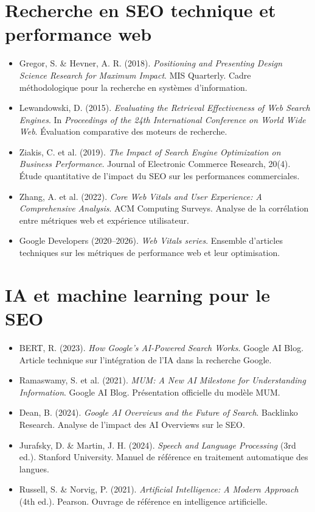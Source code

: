 \documentclass[12pt,a4paper,twoside]{report}
\begin{document}
\section*{Recherche en SEO technique et performance web}
\begin{itemize}
    \item Gregor, S. \& Hevner, A. R. (2018). \textit{Positioning and Presenting Design Science Research for Maximum Impact}. MIS Quarterly. Cadre méthodologique pour la recherche en systèmes d'information.
    \item Lewandowski, D. (2015). \textit{Evaluating the Retrieval Effectiveness of Web Search Engines}. In \textit{Proceedings of the 24th International Conference on World Wide Web}. Évaluation comparative des moteurs de recherche.
    \item Ziakis, C. et al. (2019). \textit{The Impact of Search Engine Optimization on Business Performance}. Journal of Electronic Commerce Research, 20(4). Étude quantitative de l'impact du SEO sur les performances commerciales.
    \item Zhang, A. et al. (2022). \textit{Core Web Vitals and User Experience: A Comprehensive Analysis}. ACM Computing Surveys. Analyse de la corrélation entre métriques web et expérience utilisateur.
    \item Google Developers (2020--2026). \textit{Web Vitals series}. Ensemble d'articles techniques sur les métriques de performance web et leur optimisation.
\end{itemize}

\section*{IA et machine learning pour le SEO}
\begin{itemize}
    \item BERT, R. (2023). \textit{How Google's AI-Powered Search Works}. Google AI Blog. Article technique sur l'intégration de l'IA dans la recherche Google.
    \item Ramaswamy, S. et al. (2021). \textit{MUM: A New AI Milestone for Understanding Information}. Google AI Blog. Présentation officielle du modèle MUM.
    \item Dean, B. (2024). \textit{Google AI Overviews and the Future of Search}. Backlinko Research. Analyse de l'impact des AI Overviews sur le SEO.
    \item Jurafsky, D. \& Martin, J. H. (2024). \textit{Speech and Language Processing} (3rd ed.). Stanford University. Manuel de référence en traitement automatique des langues.
    \item Russell, S. \& Norvig, P. (2021). \textit{Artificial Intelligence: A Modern Approach} (4th ed.). Pearson. Ouvrage de référence en intelligence artificielle.
\end{itemize}
\end{document}
